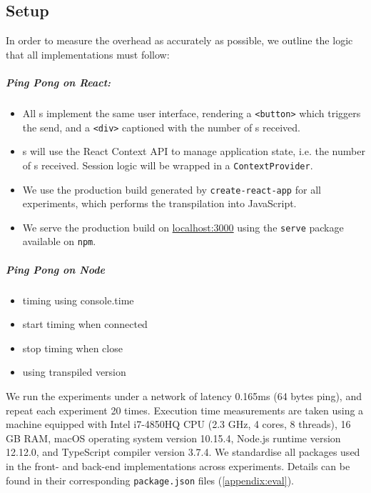 \subsection{Setup}


In order to measure the overhead as accurately as possible,
we outline the logic that all implementations must follow:

\subparagraph{Ping Pong  on React:}
\begin{itemize}

\item All s implement the same user interface, rendering
a \texttt{<button>} which triggers the send, and
a \texttt{<div>} captioned with the number of s received.

\item {}s will use the React Context API to manage 
application state, i.e. the number of s received. 
Session logic will be wrapped in a \texttt{ContextProvider}.

\item We use the production build generated by 
\texttt{create-react-app} \cite{cra} for all experiments, which performs the
transpilation into JavaScript.

\item We serve the production build on \url{localhost:3000} using the
\texttt{serve} package \cite{npmserve} available on \texttt{npm}.

\end{itemize}

\subparagraph{Ping Pong  on Node}
\begin{itemize}

\item timing using console.time

\item start timing when connected

\item stop timing when close

\item using transpiled version

\end{itemize}

We run the experiments under a network of latency 0.165ms
(64 bytes ping), and repeat each experiment 20 times.
Execution time measurements  are taken using a machine 
equipped with Intel i7-4850HQ CPU (2.3 GHz, 4 cores, 8 threads), 
16 GB RAM, macOS operating system version 10.15.4, 
Node.js runtime version 12.12.0, and
TypeScript compiler version 3.7.4.
We standardise all packages used in the front- and back-end
implementations across experiments. Details can be found in their
corresponding \texttt{package.json} files (\cref{appendix:eval}).

